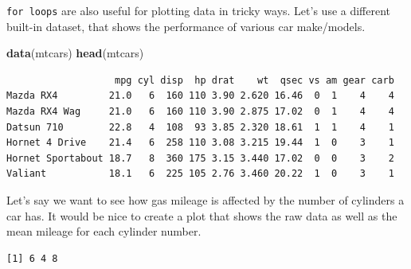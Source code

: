 \documentclass[
]{book}
\newenvironment{Shaded}{\begin{snugshade}}{\end{snugshade}}
\newcommand{\CommentTok}[1]{\textcolor[rgb]{0.56,0.35,0.01}{\textit{#1}}}
\newcommand{\KeywordTok}[1]{\textcolor[rgb]{0.13,0.29,0.53}{\textbf{#1}}}
\newcommand{\NormalTok}[1]{#1}
\newcommand{\OperatorTok}[1]{\textcolor[rgb]{0.81,0.36,0.00}{\textbf{#1}}}
\newcommand{\StringTok}[1]{\textcolor[rgb]{0.31,0.60,0.02}{#1}}
\begin{document}
\texttt{for\ loops} are also useful for plotting data in tricky ways. Let's use a different built-in dataset, that shows the performance of various car make/models.

\begin{Shaded}
\begin{Highlighting}[]
\KeywordTok{data}\NormalTok{(mtcars)}
\KeywordTok{head}\NormalTok{(mtcars)}
\end{Highlighting}
\end{Shaded}

\begin{verbatim}
                   mpg cyl disp  hp drat    wt  qsec vs am gear carb
Mazda RX4         21.0   6  160 110 3.90 2.620 16.46  0  1    4    4
Mazda RX4 Wag     21.0   6  160 110 3.90 2.875 17.02  0  1    4    4
Datsun 710        22.8   4  108  93 3.85 2.320 18.61  1  1    4    1
Hornet 4 Drive    21.4   6  258 110 3.08 3.215 19.44  1  0    3    1
Hornet Sportabout 18.7   8  360 175 3.15 3.440 17.02  0  0    3    2
Valiant           18.1   6  225 105 2.76 3.460 20.22  1  0    3    1
\end{verbatim}

Let's say we want to see how gas mileage is affected by the number of cylinders a car has. It would be nice to create a plot that shows the raw data as well as the mean mileage for each cylinder number.

\begin{Shaded}
\end{Shaded}

\begin{verbatim}
[1] 6 4 8
\end{verbatim}
\end{document}
